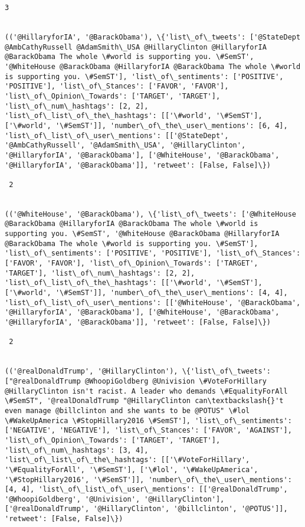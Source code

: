 \documentclass[11pt]{article}
\begin{document}
\begin{Verbatim}[commandchars=\\\{\}]
 3
 

(('@HillaryforIA', '@BarackObama'), \{'list\_of\_tweets': ['@StateDept @AmbCathyRussell @AdamSmith\_USA @HillaryClinton @HillaryforIA @BarackObama The whole \#world is supporting you. \#SemST', '@WhiteHouse @BarackObama @HillaryforIA @BarackObama The whole \#world is supporting you. \#SemST'], 'list\_of\_sentiments': ['POSITIVE', 'POSITIVE'], 'list\_of\_Stances': ['FAVOR', 'FAVOR'], 'list\_of\_Opinion\_Towards': ['TARGET', 'TARGET'], 'list\_of\_num\_hashtags': [2, 2], 'list\_of\_list\_of\_the\_hashtags': [['\#world', '\#SemST'], ['\#world', '\#SemST']], 'number\_of\_the\_user\_mentions': [6, 4], 'list\_of\_list\_of\_user\_mentions': [['@StateDept', '@AmbCathyRussell', '@AdamSmith\_USA', '@HillaryClinton', '@HillaryforIA', '@BarackObama'], ['@WhiteHouse', '@BarackObama', '@HillaryforIA', '@BarackObama']], 'retweet': [False, False]\})

 2
 

(('@WhiteHouse', '@BarackObama'), \{'list\_of\_tweets': ['@WhiteHouse @BarackObama @HillaryforIA @BarackObama The whole \#world is supporting you. \#SemST', '@WhiteHouse @BarackObama @HillaryforIA @BarackObama The whole \#world is supporting you. \#SemST'], 'list\_of\_sentiments': ['POSITIVE', 'POSITIVE'], 'list\_of\_Stances': ['FAVOR', 'FAVOR'], 'list\_of\_Opinion\_Towards': ['TARGET', 'TARGET'], 'list\_of\_num\_hashtags': [2, 2], 'list\_of\_list\_of\_the\_hashtags': [['\#world', '\#SemST'], ['\#world', '\#SemST']], 'number\_of\_the\_user\_mentions': [4, 4], 'list\_of\_list\_of\_user\_mentions': [['@WhiteHouse', '@BarackObama', '@HillaryforIA', '@BarackObama'], ['@WhiteHouse', '@BarackObama', '@HillaryforIA', '@BarackObama']], 'retweet': [False, False]\})

 2
 

(('@realDonaldTrump', '@HillaryClinton'), \{'list\_of\_tweets': ["@realDonaldTrump @WhoopiGoldberg @Univision \#VoteForHillary @HillaryClinton isn't racist. A leader who demands \#EqualityForAll \#SemST", '@realDonaldTrump "@HillaryClinton can\textbackslash{}'t even manage @billclinton and she wants to be @POTUS" \#lol \#WakeUpAmerica \#StopHillary2016 \#SemST'], 'list\_of\_sentiments': ['NEGATIVE', 'NEGATIVE'], 'list\_of\_Stances': ['FAVOR', 'AGAINST'], 'list\_of\_Opinion\_Towards': ['TARGET', 'TARGET'], 'list\_of\_num\_hashtags': [3, 4], 'list\_of\_list\_of\_the\_hashtags': [['\#VoteForHillary', '\#EqualityForAll', '\#SemST'], ['\#lol', '\#WakeUpAmerica', '\#StopHillary2016', '\#SemST']], 'number\_of\_the\_user\_mentions': [4, 4], 'list\_of\_list\_of\_user\_mentions': [['@realDonaldTrump', '@WhoopiGoldberg', '@Univision', '@HillaryClinton'], ['@realDonaldTrump', '@HillaryClinton', '@billclinton', '@POTUS']], 'retweet': [False, False]\})


\end{Verbatim}
\end{document}

